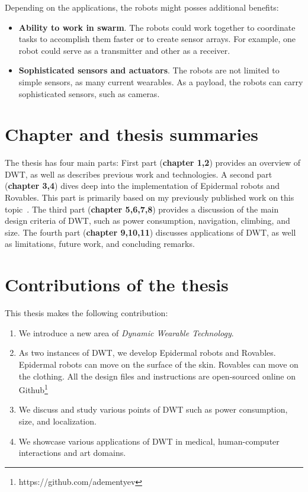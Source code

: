 Depending on the applications, the robots might posses additional benefits: 
\begin{itemize} 

\item \textbf{Ability to work in swarm}. The robots could work together to coordinate tasks to accomplish them faster or to create sensor arrays. For example, one robot could serve as a transmitter and other as a receiver. 
\item \textbf{Sophisticated sensors and actuators}. The robots are not limited to simple sensors, as many current wearables. As a payload, the robots can carry sophisticated sensors, such as cameras. 
\end{itemize}

\section{Chapter and thesis summaries}
The thesis has four main parts: First part (\textbf{chapter 1,2}) provides an overview of DWT, as well as describes previous work and technologies. A second part (\textbf{chapter 3,4}) dives deep into the implementation of Epidermal robots and Rovables. This part is primarily based on my previously published work on this topic~\cite{dementyev2016rovables,dementyev2018epidermal,kao2017exploring,dementyev2017skinbot}. The third part (\textbf{chapter 5,6,7,8}) provides a discussion of the main design criteria of DWT, such as power consumption, navigation, climbing, and size. The fourth part (\textbf{chapter 9,10,11}) discusses applications of DWT, as well as limitations, future work, and concluding remarks.

\section{Contributions of the thesis}
This thesis makes the following contribution:
\begin{enumerate}
\item We introduce a new area of \textit{Dynamic Wearable Technology}. 
\item As two instances of DWT, we develop Epidermal robots and Rovables. Epidermal robots can move on the surface of the skin. Rovables can move on the clothing.  All the design files and instructions are open-sourced online on Github\footnote{https://github.com/adementyev}
\item We discuss and study various points of DWT such as power consumption, size, and localization. 
\item We showcase various applications of DWT in medical, human-computer interactions and art domains. 
\end{enumerate}








